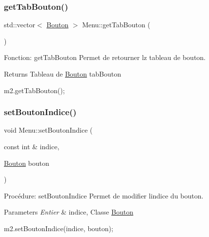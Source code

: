 \subsubsection{\texorpdfstring{get\+Tab\+Bouton()}{getTabBouton()}}
{\footnotesize\ttfamily std\+::vector$<$ \hyperlink{classBouton}{Bouton} $>$ Menu\+::get\+Tab\+Bouton (\begin{DoxyParamCaption}{ }\end{DoxyParamCaption})}



Fonction\+: get\+Tab\+Bouton Permet de retourner lz tableau de bouton. 

\begin{DoxyReturn}{Returns}
Tableau de \hyperlink{classBouton}{Bouton} tab\+Bouton 
\begin{DoxyCode}
m2.getTabBouton();
\end{DoxyCode}
 
\end{DoxyReturn}
\mbox{\label{classMenu_acedbb44af6fcc981aef033a585df2169}} 
\subsubsection{\texorpdfstring{set\+Bouton\+Indice()}{setBoutonIndice()}}
{\footnotesize\ttfamily void Menu\+::set\+Bouton\+Indice (\begin{DoxyParamCaption}\item[{const int \&}]{indice,  }\item[{\hyperlink{classBouton}{Bouton}}]{bouton }\end{DoxyParamCaption})}



Procédure\+: set\+Bouton\+Indice Permet de modifier l\textquotesingle{}indice du bouton\textquotesingle{}. 


\begin{DoxyParams}{Parameters}
{\em Entier} & indice, Classe \hyperlink{classBouton}{Bouton} 
\begin{DoxyCode}
m2.setBoutonIndice(indice, bouton);
\end{DoxyCode}
 \\
\hline
\end{DoxyParams}
\mbox{\label{classMenu_a45b3fe1a4d7cca82acabd3102d8bfd7c}} 
